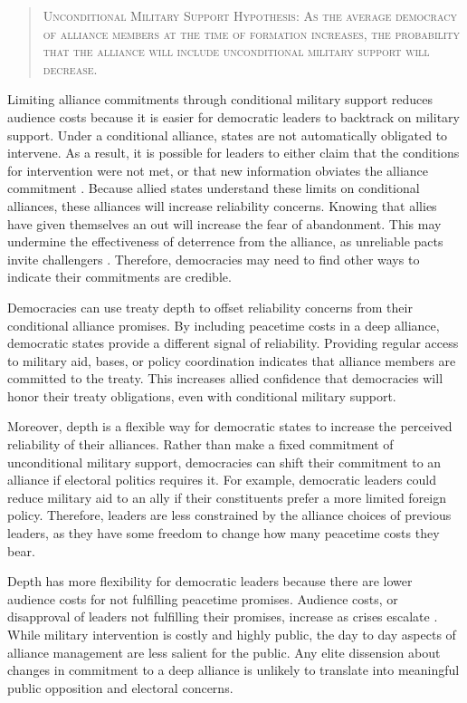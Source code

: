 \documentclass[12pt]{article}
\begin{document}
\begin{quote}
\textsc{Unconditional Military Support Hypothesis: As the average democracy of alliance members at the time of formation increases, the probability that the alliance will include unconditional military support will decrease.}
\end{quote} 


Limiting alliance commitments through conditional military support reduces audience costs because it is easier for democratic leaders to backtrack on military support. 
Under a conditional alliance, states are not automatically obligated to intervene. 
As a result, it is possible for leaders to either claim that the conditions for intervention were not met, or that new information obviates the alliance commitment \citep{LevenduskyHorowitz2012}. 
Because allied states understand these limits on conditional alliances, these alliances will increase reliability concerns. 
Knowing that allies have given themselves an out will increase the fear of abandonment. 
This may undermine the effectiveness of deterrence from the alliance, as unreliable pacts invite challengers \citep{Smith1995}. 
Therefore, democracies may need to find other ways to indicate their commitments are credible. 


Democracies can use treaty depth to offset reliability concerns from their conditional alliance promises.  
By including peacetime costs in a deep alliance, democratic states provide a different signal of reliability. 
Providing regular access to military aid, bases, or policy coordination indicates that alliance members are committed to the treaty. 
This increases allied confidence that democracies will honor their treaty obligations, even with conditional military support. 


Moreover, depth is a flexible way for democratic states to increase the perceived reliability of their alliances. 
Rather than make a fixed commitment of unconditional military support, democracies can shift their commitment to an alliance if electoral politics requires it.
For example, democratic leaders could reduce military aid to an ally if their constituents prefer a more limited foreign policy.  
Therefore, leaders are less constrained by the alliance choices of previous leaders, as they have some freedom to change how many peacetime costs they bear. 


Depth has more flexibility for democratic leaders because there are lower audience costs for not fulfilling peacetime promises. 
Audience costs, or disapproval of leaders not fulfilling their promises, increase as crises escalate \citep{Tomz2007}. 
While military intervention is costly and highly public, the day to day aspects of alliance management are less salient for the public. 
Any elite dissension about changes in commitment to a deep alliance is unlikely to translate into meaningful public opposition and electoral concerns. 
\end{document}
